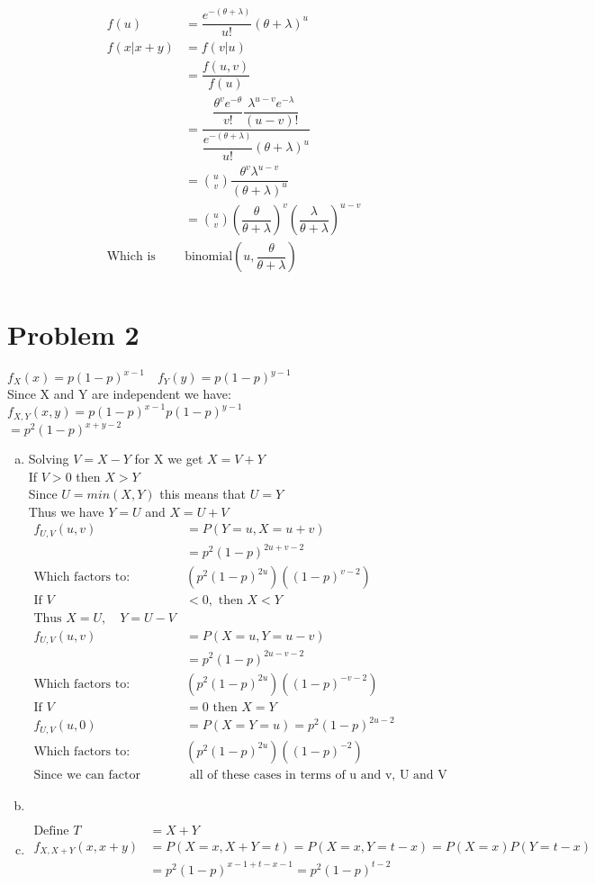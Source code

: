 \documentclass{article}
\begin{document}
\begin{flushleft}
\begin{align*}
f(u)&=\dfrac{e^{-(\theta+\lambda)}}{u!}(\theta+\lambda)^u\\
f(x|x+y)&= f(v|u)\\
&=\dfrac{f(u,v)}{f(u)}\\
&=\dfrac{\dfrac{\theta^v e^{-\theta}}{v!} \dfrac{\lambda^{u-v} e^{-\lambda}}{(u-v)!}}{\dfrac{e^{-(\theta+\lambda)}}{u!}(\theta+\lambda)^u}\\
&={u \choose v}\dfrac{\theta^v \lambda^{u-v}}{(\theta+\lambda)^u}\\
&={u \choose v}\left(\dfrac{\theta}{\theta+\lambda}\right)^{v} \left(\dfrac{\lambda}{\theta+\lambda}\right)^{u-v}\\
\text{Which is }& \text{binomial}\left(u,\dfrac{\theta}{\theta+\lambda}\right)\\
\end{align*}
\section*{Problem 2}
$f_X(x)=p(1-p)^{x-1} \quad f_Y(y)=p(1-p)^{y-1}$\\
Since X and Y are independent we have:\\
$f_{X,Y}(x,y)=p(1-p)^{x-1}p(1-p)^{y-1}$\\
$=p^2(1-p)^{x+y-2}$\\
\begin{enumerate}[(a)]
\item 
Solving $V=X-Y$ for X we get $X=V+Y$\\ 
If $V>0$ then $X>Y$\\
Since $U=min(X,Y)$ this means that $U=Y$\\
Thus we have $Y=U$ and $X=U+V$
\begin{align*}
f_{U,V}(u,v)&=P(Y=u,X=u+v)\\
&=p^2(1-p)^{2u+v-2}\\
\text{Which factors to: }& (p^2(1-p)^{2u})((1-p)^{v-2})\\
\text{If } V&<0, \text{ then } X<Y\\
\text{Thus } X=U, \quad Y=U-V\\
f_{U,V}(u,v)&=P(X=u,Y=u-v)\\
&=p^2(1-p)^{2u-v-2}\\
\text{Which factors to: }& (p^2(1-p)^{2u})((1-p)^{-v-2})\\
\text{If } V&=0 \text{ then } X=Y\\
f_{U,V}(u,0)&=P(X=Y=u)=p^2(1-p)^{2u-2}\\
\text{Which factors to: }& (p^2(1-p)^{2u})((1-p)^{-2})\\
\text{Since we can factor}&\text{ all of these cases in terms of u and v, U and V are independent }
\end{align*}
\item 
\begin{align*}
\end{align*}
\item
\begin{align*}
\text{Define } T&=X+Y\\
f_{X,X+Y}(x,x+y)&=P(X=x,X+Y=t)=P(X=x,Y=t-x)=P(X=x)P(Y=t-x)\\
&=p^2(1-p)^{x-1+t-x-1}=p^2(1-p)^{t-2}
\end{align*}
\end{enumerate}

\end{flushleft}
\end{document}
